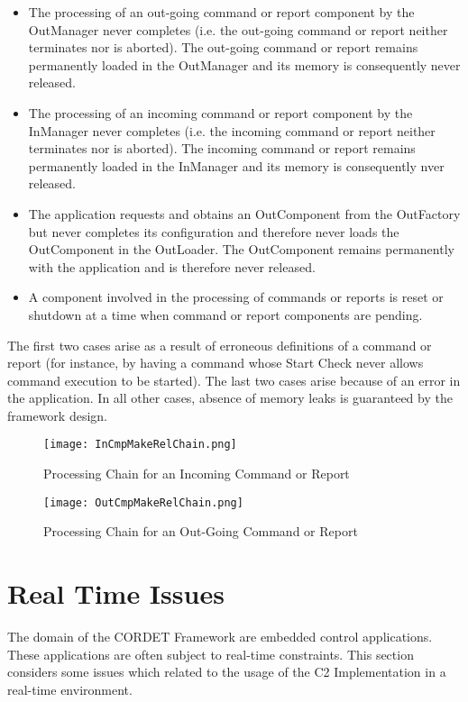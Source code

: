 \documentclass{pnp_article}
\begin{document}
\begin{itemize}
\item The processing of an out-going command or report component by the OutManager never completes (i.e. the out-going command or report neither terminates nor is aborted). The out-going command or report remains permanently loaded in the OutManager and its memory is consequently never released. 
\item The processing of an incoming command or report component by the InManager never completes (i.e. the incoming command or report neither terminates nor is aborted). The incoming command or report remains permanently loaded in the InManager and its memory is consequently nver released. 
\item The application requests and obtains an OutComponent from the OutFactory but never completes its configuration and therefore never loads the OutComponent in the OutLoader. The OutComponent remains permanently with the application and is therefore never released.
\item A component involved in the processing of commands or reports is reset or shutdown at a time when command or report components are pending.
\end{itemize}

The first two cases arise as a result of erroneous definitions of a command or report (for instance, by having a command whose Start Check never allows command execution to be started). The last two cases arise because of an error in the application. In all other cases, absence of memory leaks is guaranteed by the framework design.

\begin{figure}[h]
 \centering
 \texttt{[image: InCmpMakeRelChain.png]}
 \caption{Processing Chain for an Incoming Command or Report}
 \label{fig:InCmpMakeRelChain}
\end{figure}

\begin{figure}[H]
 \centering
 \texttt{[image: OutCmpMakeRelChain.png]}
 \caption{Processing Chain for an Out-Going Command or Report}
 \label{fig:OutCmpMakeRelChain}
\end{figure}

\clearpage
\section{Real Time Issues}\label{sec:RTIssues}
The domain of the CORDET Framework are embedded control applications. These applications are often subject to real-time constraints. This section considers some issues which related to the usage of the C2 Implementation in a real-time environment.
\end{document}
